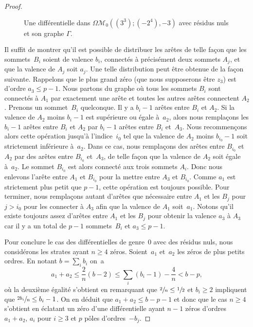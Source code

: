 \documentclass[11pt]{article}
\numberwithin{equation}{section}\renewcommand{\proofname}{Démonstration}
\let\mathcal\mathscr
\newcommand{\omoduli}[1][g]{{\Omega\mathcal M}_{\!#1}}
\theoremstyle{definition}
\begin{document}
\begin{proof}
\begin{figure}[htb]
\caption{Une différentielle dans $\omoduli[0]((3^3);(-2^4),-3)$ avec résidus nuls et son graphe $\Gamma$.} \label{fig:troiszerossansres}
\end{figure}

Il suffit de montrer qu'il est possible de distribuer les arêtes de telle façon que les sommets~$B_{i}$ soient de valence $b_{i}$, connectés à précisément deux sommets $A_{j}$, et que la valence de $A_{j}$ soit $a_{j}$.
Une telle distribution peut être obtenue de la façon suivante. Rappelons que le plus grand zéro (que nous supposerons être $z_{3}$) est d'ordre $a_{3}\leq p-1$. Nous partons du graphe où tous les sommets $B_{i}$ sont connectés à $A_{1}$ par exactement une arête et toutes les autres arêtes connectent $A_{2}$. Prenons un sommet~$B_{i}$ quelconque. Il y a $b_{i}-1$ arêtes entre $B_{i}$ et $A_{2}$. Si la valence de $A_{2}$ moins $b_{i}-1$ est supérieure ou égale à~$a_{2}$, alors nous remplaçons les $b_{i}-1$ arêtes entre $B_{i}$ et $A_{2}$ par $b_{i}-1$ arêtes entre $B_{i}$ et~$A_{3}$. Nous recommençons alors cette opération jusqu'à l'indice~$i_{0}$ tel que la valence de $A_{2}$ moins $b_{i_{0}}-1$ soit strictement inférieure à~$a_{2}$. Dans ce cas, nous remplaçons des arêtes entre $B_{i_{0}}$ et $A_{2}$ par des arêtes entre $B_{i_{0}}$ et~$A_{3}$, de telle façon que la valence de $A_{2}$ soit égale à~$a_{2}$. Le sommet $B_{i_{0}}$ est alors connecté aux trois sommets $A_{i}$. Donc nous enlevons l'arête entre $A_{1}$ et $B_{i_{0}}$ pour la mettre entre $A_{3}$ et $B_{i_{0}}$. Comme $a_{1}$ est strictement plus petit que $p-1$, cette opération est toujours possible. Pour terminer, nous remplaçons autant d'arêtes que nécessaire entre $A_{1}$ et les $B_{j}$ pour $j > i_{0}$ pour les connecter à $A_{3}$ afin que la valence de $A_{1}$ soit~$a_{1}$. Notons qu'il existe toujours assez d'arêtes entre $A_{1}$ et les $B_{j}$ pour obtenir la valence $a_{3}$ à $A_{3}$ car il y a un total de $p-1$ sommets~$B_{i}$ et $a_{3}\leq p-1$.

Pour conclure le cas des différentielles de genre~$0$ avec des résidus nuls, nous considérons les strates ayant $n\geq4$ zéros. Soient~$a_{1}$ et~$a_{2}$ les zéros de plus petits ordres. En notant $b=\sum_{i} b_{i}$ on~a
\begin{equation*}
a_{1}+a_{2} \leq \frac{2}{n}\left(b-2\right)\leq \sum_{i}(b_{i}-1) -\frac{4}{n} < b -p,
\end{equation*}
où la deuxième égalité s'obtient en remarquant que $\sfrac{2}{n} \leq \sfrac {1}{2}$ et $b_{i}\geq2$ impliquent que $\sfrac{2b_{i}}{n}\leq b_{i}-1$. On en déduit que $ a_{1}+a_{2} \leq b -p - 1$ et donc que le cas $n\geq 4$ s'obtient en éclatant un zéro d'une différentielle ayant $n-1$ zéros d'ordres $a_{1}+a_{2}$, $a_{i}$ pour $i\geq 3$ et $p$ pôles d'ordres~$-b_{j}$.
\end{proof}
\end{document}
